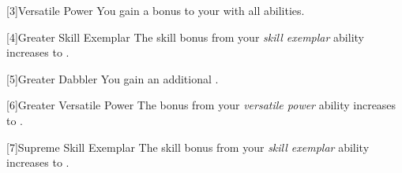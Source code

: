         [3]{Versatile Power}
        You gain a  bonus to your  with all abilities.

        [4]{Greater Skill Exemplar} The skill bonus from your \textit{skill exemplar} ability increases to .

        [5]{Greater Dabbler} You gain an additional .

        [6]{Greater Versatile Power} The bonus from your \textit{versatile power} ability increases to .

        [7]{Supreme Skill Exemplar} The skill bonus from your \textit{skill exemplar} ability increases to .






